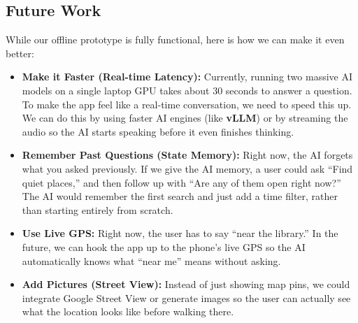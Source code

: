 \documentclass[11pt,a4paper]{article}
\begin{document}
\subsection{Future Work}
While our offline prototype is fully functional, here is how we can make it even better:

\begin{itemize}
    \item \textbf{Make it Faster (Real-time Latency):} Currently, running two massive AI models on a single laptop GPU takes about 30 seconds to answer a question. To make the app feel like a real-time conversation, we need to speed this up. We can do this by using faster AI engines (like \textbf{vLLM}) or by streaming the audio so the AI starts speaking before it even finishes thinking.
    \item \textbf{Remember Past Questions (State Memory):} Right now, the AI forgets what you asked previously. If we give the AI memory, a user could ask ``Find quiet places,'' and then follow up with ``Are any of them open right now?'' The AI would remember the first search and just add a time filter, rather than starting entirely from scratch.
    \item \textbf{Use Live GPS:} Right now, the user has to say ``near the library.'' In the future, we can hook the app up to the phone's live GPS so the AI automatically knows what ``near me'' means without asking.
    \item \textbf{Add Pictures (Street View):} Instead of just showing map pins, we could integrate Google Street View or generate images so the user can actually see what the location looks like before walking there.
\end{itemize}
\end{document}

